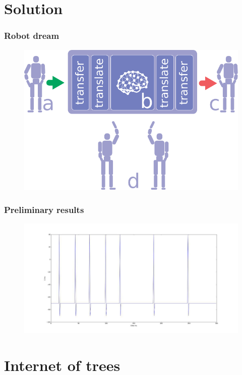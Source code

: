 \documentclass[12pt, aspectratio=169]{beamer}
\begin{document}
\section{Solution}

\begin{frame}
\frametitle{Robot dream}
\begin{figure}
\includegraphics[width=0.8\linewidth]{robot-dream}
\end{figure}
\end{frame}


\begin{frame}
\frametitle{Preliminary results}
\begin{figure}
\includegraphics[width=0.8\linewidth]{pseudo-neuronal-activity}
\end{figure}
\end{frame}

\section{Internet of trees}
\end{document}
